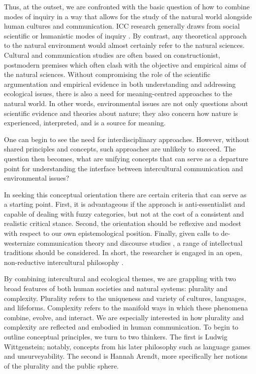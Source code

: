 Thus, at the outset, we are confronted with the basic question of how to combine modes of inquiry in a way that allows for the study of the natural world alongside human cultures and communication. ICC research generally draws from social scientific or humanistic modes of inquiry \citep[see][]{Littlejohn2011a}. By contrast, any theoretical approach to the natural environment would almost certainly refer to the natural sciences. Cultural and communication studies are often based on constructionist, postmodern premises which often clash with the objective and empirical aims of the natural sciences. Without compromising the role of the scientific argumentation and empirical evidence in both understanding and addressing ecological issues, there is also a need for meaning-centred approaches to the natural world. In other words, environmental issues are not only questions about scientific evidence and theories about nature; they also concern how nature is experienced, interpreted, and is a source for meaning.

One can begin to see the need for interdisciplinary approaches. However, without shared principles and concepts, such approaches are unlikely to succeed. The question then becomes, what are unifying concepts that can serve as a departure point for understanding the interface between intercultural communication and environmental issues?

In seeking this conceptual orientation there are certain criteria that can serve as a starting point. First, it is advantageous if the approach is anti-essentialist and capable of dealing with fuzzy categories, but not at the cost of a consistent and realistic critical stance. Second, the orientation should be reflexive and modest with respect to our own epistemological position. Finally, given calls to de-westernize communication theory and discourse studies \citep[e.g.][]{Shi-xu2005a, Tapas2012a, Waisbord2014a}, a range of intellectual traditions should be considered. In short, the researcher is engaged in an open, non-reductive intercultural philosophy \citep[see][]{Mall2000a}.

By combining intercultural and ecological themes, we are grappling with two broad features of both human societies and natural systems: plurality and complexity. Plurality refers to the uniqueness and variety of cultures, languages, and lifeforms. Complexity refers to the manifold ways in which these phenomena combine, evolve, and interact. We are especially interested in how plurality and complexity are reflected and embodied in human communication. To begin to outline conceptual principles, we turn to two thinkers. The first is Ludwig Wittgenstein; notably, concepts from his later philosophy such as language games and unsurveyability. The second is Hannah Arendt, more specifically her notions of the plurality and the public sphere.

